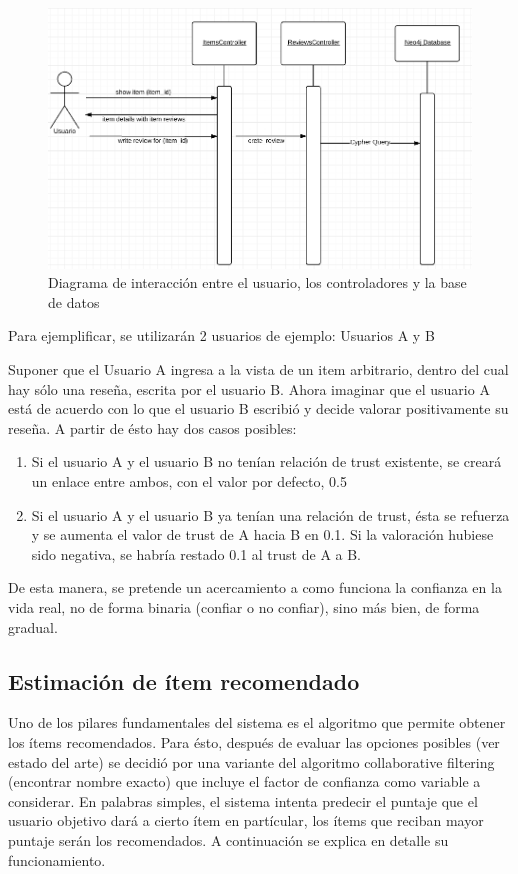 \begin{figure}[hbtp]
\centering
\includegraphics[scale=0.8]{images/review_history.png}
\caption{Diagrama de interacción entre el usuario, los controladores y la base de datos}
\end{figure}

Para ejemplificar, se utilizarán 2 usuarios de ejemplo: Usuarios A y B

Suponer que el Usuario A ingresa a la vista de un item arbitrario, dentro del cual hay sólo una reseña, escrita por el usuario B. Ahora imaginar que el usuario A está de acuerdo con lo que el usuario B escribió y decide valorar positivamente su reseña. A partir de ésto hay dos casos posibles:

\begin{enumerate}
\item{Si el usuario A y el usuario B no tenían relación de trust existente, se creará un enlace entre ambos, con el valor por defecto, 0.5}
\item{Si el usuario A y el usuario B ya tenían una relación de trust, ésta se refuerza y se aumenta el valor de trust de A hacia B en 0.1. Si la valoración hubiese sido negativa, se habría restado 0.1 al trust de A a B.}
\end{enumerate}

De esta manera, se pretende un acercamiento a como funciona la confianza en la vida real, no de forma binaria (confiar o no confiar), sino más bien, de forma gradual. 

\subsection{Estimación de ítem recomendado}

Uno de los pilares fundamentales del sistema es el algoritmo que permite obtener los ítems recomendados. Para ésto, después de evaluar las opciones posibles (ver estado del arte) se decidió por una variante del algoritmo collaborative filtering (encontrar nombre exacto) que incluye el factor de confianza como variable a considerar. En palabras simples, el sistema intenta predecir el puntaje que el usuario objetivo dará a cierto ítem en partícular, los ítems que reciban mayor puntaje serán los recomendados. A continuación se explica en detalle su funcionamiento.


